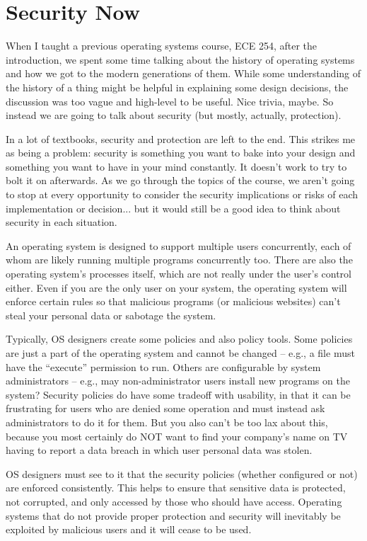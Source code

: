 \section*{Security Now}
When I taught a previous operating systems course, ECE 254, after the introduction, we spent some time talking about the history of operating systems and how we got to the modern generations of them. While some understanding of the history of a thing might be helpful in explaining some design decisions, the discussion was too vague and high-level to be useful. Nice trivia, maybe. So instead we are going to talk about security (but mostly, actually, protection).

In a lot of textbooks, security and protection are left to the end. This strikes me as being a problem: security is something you want to bake into your design and something you want to have in your mind constantly. It doesn't work to try to bolt it on afterwards. As we go through the topics of the course, we aren't going to stop at every opportunity to consider the security implications or risks of each implementation or decision... but it would still be a good idea to think about security in each situation.

An operating system is designed to support multiple users concurrently, each of whom are likely running multiple programs concurrently too. There are also the operating system's processes itself, which are not really under the user's control either. Even if you are the only user on your system, the operating system will enforce certain rules so that malicious programs (or malicious websites) can't steal your personal data or sabotage the system. 

Typically, OS designers create some policies and also policy tools. Some policies are just a part of the operating system and cannot be changed -- e.g., a file must have the ``execute'' permission to run. Others are configurable by system administrators -- e.g., may non-administrator users install new programs on the system? Security policies do have some tradeoff with usability, in that it can be frustrating for users who are denied some operation and must instead ask administrators to do it for them. But you also can't be too lax about this, because you most certainly do NOT want to find your company's name on TV having to report a data breach in which user personal data was stolen.

OS designers must see to it that the security policies (whether configured or not) are enforced consistently. This helps to ensure that sensitive data is protected, not corrupted, and only accessed by those who should have access. Operating systems that do not provide proper protection and security will inevitably be exploited by malicious users and it will cease to be used. 

